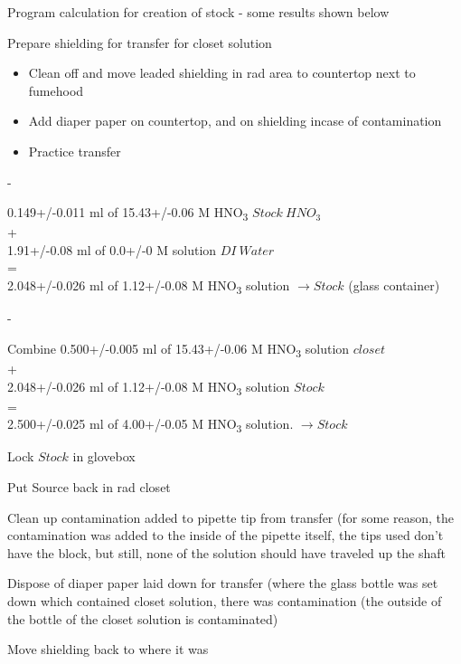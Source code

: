 \documentclass[idxtotoc,hyperref,openany,oneside]{labbook} %
\newcommand{\cmark}{\ding{51}}%
\newcommand{\done}{\rlap{$\square$}{\raisebox{2pt}{\large\hspace{1pt}\cmark}}%
  \hspace{-2.5pt}}
\newcommand{\tsbs}{\textsubscript}
\begin{document}


\begin{todolist}
\item[\done]{Program calculation for creation of stock - some
results shown below}
\item[\done]{Prepare shielding for transfer for closet solution}
  \begin{itemize}
  \item{Clean off and move leaded shielding in rad area to
    countertop next to fumehood}
  \item{Add diaper paper on countertop, and on shielding incase
    of contamination}
  \item{Practice transfer}
  \end{itemize}
\item[\done]{-}
\end{todolist}
\begin{center}
    0.149+/-0.011 ml of 15.43+/-0.06 M HNO\tsbs{3} $\boxed{Stock\ HNO_3}$\\
    +\\
    1.91+/-0.08  ml of 0.0+/-0 M solution $\boxed{DI\ Water}$\\
    = \\
    2.048+/-0.026 ml of 1.12+/-0.08 M HNO\tsbs{3}
  solution $\boxed{\rightarrow Stock}$ (glass container)
\end{center}
\begin{todolist}
\item[\done]{-}
\end{todolist}
\begin{center}
Combine 0.500+/-0.005 ml of 15.43+/-0.06 M HNO\tsbs{3}
solution $\boxed{closet}$\\
+\\
2.048+/-0.026 ml of 1.12+/-0.08 M HNO\tsbs{3} solution
$\boxed{Stock}$
\\
=\\
2.500+/-0.025 ml of 4.00+/-0.05 M HNO\tsbs{3} solution.
$\boxed{\rightarrow Stock}$
\end{center}

\begin{todolist}
\item[\done]{Lock $\boxed{Stock}$ in glovebox}
\item[\done]{Put Source back in rad closet}
\item[\done]{Clean up contamination added to pipette tip from transfer (for some reason, the contamination was added to the inside of the pipette itself, the tips used don't have the block, but still, none of the solution should have traveled up the shaft}
\item[\done]{Dispose of diaper paper laid down for transfer (where the glass bottle was set down which contained closet solution, there was contamination (the outside of the bottle of the closet solution is contaminated)}
\item[\done]{Move shielding back to where it was}
\end{todolist}
\end{document}
